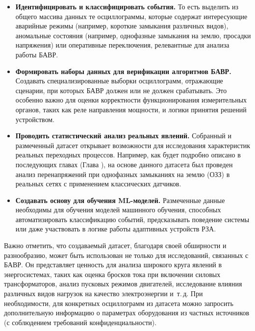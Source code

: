 \begin{itemize}
  \item \textbf{Идентифицировать и классифицировать события.} То есть выделить из общего массива данных те осциллограммы, которые содержат интересующие аварийные режимы (например, короткие замыкания различных видов), аномальные состояния (например, однофазные замыкания на землю, просадки напряжения) или оперативные переключения, релевантные для анализа работы БАВР.
  \item \textbf{Формировать наборы данных для верификации алгоритмов БАВР.} Создавать специализированные выборки осциллограмм, отражающие сценарии, при которых БАВР должен или не должен срабатывать. Это особенно важно для оценки корректности функционирования измерительных органов, таких как реле направления мощности, и логики принятия решений устройством.
  \item \textbf{Проводить статистический анализ реальных явлений.} Собранный и размеченный датасет открывает возможности для исследования характеристик реальных переходных процессов. Например, как будет подробно описано в последующих главах (Глава ), на основе данного датасета был проведен анализ перенапряжений при однофазных замыканиях на землю (ОЗЗ) в реальных сетях с применением классических датчиков.
  \item \textbf{Создавать основу для обучения ML-моделей.} Размеченные данные необходимы для обучения моделей машинного обучения, способных автоматизировать классификацию событий, предсказывать поведение системы или даже участвовать в логике работы адаптивных устройств РЗА.
\end{itemize}

Важно отметить, что создаваемый датасет, благодаря своей обширности и разнообразию,
может быть использован не только для исследований, связанных с БАВР. Он представляет
ценность для анализа широкого круга явлений в энергосистемах, таких как оценка бросков
тока при включении силовых трансформаторов, анализ пусковых режимов двигателей,
исследование влияния различных видов нагрузок на качество электроэнергии и~т.\,д. При
необходимости, для конкретных осциллограмм из датасета можно запросить дополнительную
информацию о параметрах оборудования из частных источников (с соблюдением требований
конфиденциальности).

